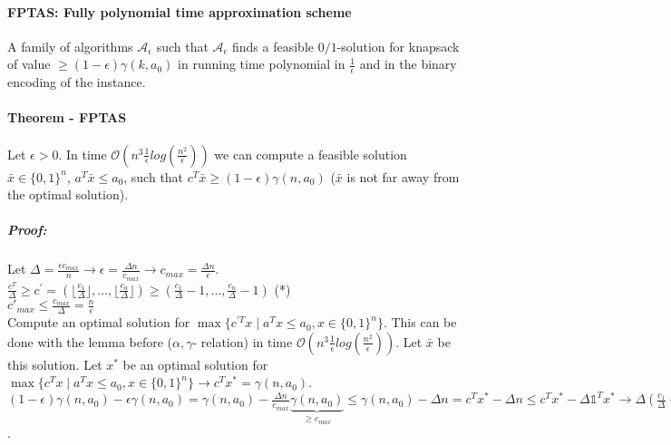 \documentclass[main]{subfiles}
\begin{document}
\paragraph{FPTAS: Fully polynomial time approximation scheme} A family of
algorithms $\mathcal{A}_\epsilon$ such that $\mathcal{A}_\epsilon$ finds a
feasible $0/1$-solution for knapsack of value $\geq (1-\epsilon) \gamma (k,
a_0)$ in running time polynomial in $\frac{1}{\epsilon}$ and in the binary
encoding of the instance.

\paragraph{Theorem - FPTAS} Let $\epsilon > 0$. In time $\mathcal{O}(n^3
\frac{1}{\epsilon} log (\frac{n^2}{\epsilon}))$ we can compute a feasible
solution $\bar{x} \in \{0,1\}^n$, $a^T \bar{x} \leq a_0$, such that $c^T
\bar{x} \geq (1-\epsilon) \gamma (n, a_0)$ ($\bar{x}$ is not far away from the
optimal solution).

\subparagraph{Proof:}
Let $\Delta = \frac{\epsilon c_{max}}{n} \rightarrow \epsilon = \frac{\Delta n}
{c_{max}} \rightarrow c_{max} = \frac{\Delta n}{\epsilon}$.\\
$\frac{c^T}{\Delta} \geq c^\prime = (\lfloor \frac{c_1}{\Delta} \rfloor, \dots,
\lfloor \frac{c_n}{\Delta} \rfloor) \geq (\frac{c_1}{\Delta} - 1, \dots,
\frac{c_n}{\Delta} - 1)$ (*)\\
$c'_{max} \leq \frac{c_{max}}{\Delta} = \frac{n}{\epsilon}$\\
Compute an optimal solution for $\max \{c^{\prime T} x \mid a^T x \leq a_0,
x \in \{0,1\}^n \}$. This can be done with the lemma before ($\alpha, \gamma$-
relation) in time $\mathcal{O}(n^3 \frac{1}{\epsilon} log(\frac{n^2}
{\epsilon}))$. Let $\bar{x}$ be this solution. Let $x^*$ be an optimal solution 
for $\max \{c^T x \mid a^T x \leq a_0, x \in \{0,1\}^n\} \rightarrow c^T x^* =
\gamma (n, a_0)$.\\
$(1-\epsilon) \gamma (n,a_0) - \epsilon \gamma (n, a_0) = \gamma (n,a_0) -
\frac{\Delta n}{c_{max}} \underbrace{\gamma (n, a_0)}_{\geq c_{max}} \leq 
\gamma (n, a_0) - \Delta n = c^T x^* - \Delta n \leq c^T x^* - \Delta
\mathds{1}^T x^* \rightarrow \Delta (\frac{c_1}{\Delta} - 1, \dots, \frac{c_n}
{\Delta}-1) x^* \underbrace{\leq}_{\text{(*)}} \Delta c^{\prime T} x^* \leq 
\Delta c^{T} \bar{x} \leq c^T x$.
\end{document}

